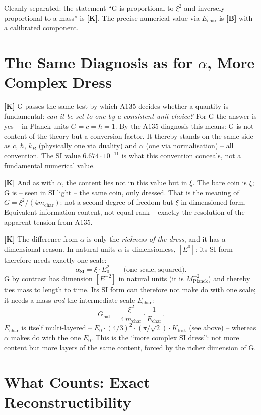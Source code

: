 Cleanly separated: the statement ``G is proportional to $\xi^2$ and inversely
proportional to a mass'' is \textbf{[K]}. The precise numerical value via
$E_\text{char}$ is \textbf{[B]} with a calibrated component.

\section{The Same Diagnosis as for $\alpha$, More Complex Dress}

\textbf{[K]} G passes the same test by which A135 decides whether a quantity is
fundamental: \emph{can it be set to one by a consistent unit choice?} For G the
answer is yes -- in Planck units $G = c = \hbar = 1$. By the A135 diagnosis this
means: G is not content of the theory but a conversion factor. It thereby stands
on the same side as $c$, $\hbar$, $k_B$ (physically one via duality) and $\alpha$
(one via normalisation) -- all convention. The SI value $6{.}674\cdot10^{-11}$ is
what this convention conceals, not a fundamental numerical value.

\textbf{[K]} And as with $\alpha$, the content lies not in this value but in $\xi$.
The bare coin is $\xi$; G is -- seen in SI light -- the same coin, only dressed.
That is the meaning of $G = \xi^2/(4m_\text{char})$: not a second degree of freedom
but $\xi$ in dimensioned form. Equivalent information content, not equal rank --
exactly the resolution of the apparent tension from A135.

\textbf{[K]} The difference from $\alpha$ is only the \emph{richness of the dress},
and it has a dimensional reason. In natural units $\alpha$ is dimensionless, $[E^0]$;
its SI form therefore needs exactly one scale:
\[
  \alpha_\text{SI} = \xi\cdot E_0^2 \qquad\text{(one scale, squared).}
\]
G by contrast has dimension $[E^{-2}]$ in natural units (it is $M_\text{Planck}^{-2}$)
and thereby ties mass to length to time. Its SI form can therefore not make do
with one scale; it needs a mass \emph{and} the intermediate scale $E_\text{char}$:
\[
  G_\text{nat} = \frac{\xi^2}{4\,m_\text{char}}\cdot\frac{1}{E_\text{char}}.
\]
$E_\text{char}$ is itself multi-layered -- $E_0\cdot(4/3)^2\cdot(\pi/\sqrt2)\cdot
K_\text{frak}$ (see above) -- whereas $\alpha$ makes do with the one $E_0$.
This is the ``more complex SI dress'': not more content but more layers of the
same content, forced by the richer dimension of G.

\section{What Counts: Exact Reconstructibility}

